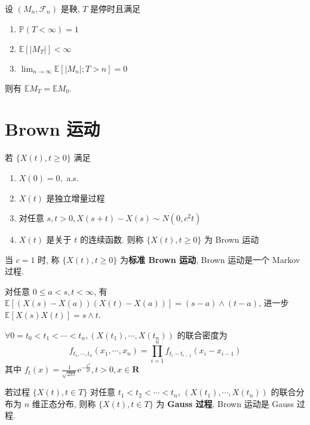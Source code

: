 \documentclass[10pt]{yerbaformat}
\begin{document}
\begin{theorem}[停止定理]
    设 $\left(M_{n}, \mathcal{F}_{n}\right)$ 是鞅, $T$ 是停时且满足
    \begin{enumerate}
        \item $\mathbb{P}(T<\infty)=1$
        \item $\mathbb{E}\left[\left|M_{T}\right|\right]<\infty$
        \item $\lim _{n \rightarrow \infty} \mathbb{E}\left[\left|M_{n}\right| ; T>n\right]=0$
    \end{enumerate}
    则有 $\mathbb{E} M_{T}=\mathbb{E} M_{0}$.
\end{theorem}

\section{Brown 运动}

\begin{definition}[Brown 运动]
    若 $\{X(t), t \geq 0\}$ 满足
    \begin{enumerate}
        \item $X(0)=0,$ a.s.
        \item $X(t)$ 是独立增量过程
        \item 对任意 $s, t>0, X(s+t)-X(s) \sim N\left(0, c^{2} t\right)$
        \item $X(t)$ 是关于 $t$ 的连续函数. 则称 $\{X(t), t \geq 0\}$ 为 Brown 运动
    \end{enumerate}
    当 $c=1$ 时, 称 $\{X(t), t \geq 0\}$ 为\textbf{标准 Brown 运动}, Brown 运动是一个 Markov 过程.
\end{definition}

\begin{theorem}
    对任意 $0 \leq a<s, t<\infty$, 有$\mathbb{E}[(X(s)-X(a))(X(t)-X(a))]=(s-a) \wedge(t-a)$, 进一步 $\mathbb{E}[X(s) X(t)]=s \wedge t$.
\end{theorem}

\begin{theorem}[有限维分布]
    $\forall 0=t_{0}<t_{1}<\cdots<t_{n},\left(X\left(t_{1}\right), \cdots, X\left(t_{n}\right)\right)$ 的联合密度为 $$f_{t_{1}, \cdots, t_{n}}\left(x_{1}, \cdots, x_{n}\right)=\prod_{i=1}^{n} f_{t_{i}-t_{i-1}}\left(x_{i}-x_{i-1}\right)$$ 其中 $f_{t}(x)=\frac{1}{\sqrt{2 \pi t}} \mathrm{e}^{-\frac{x^{2}}{2 t}}, t>0, x \in \mathbf{R}$
\end{theorem}

\begin{definition}[Gauss 过程]
    若过程 $\{X(t), t \in T\}$ 对任意 $t_{1}<t_{2}<\cdots<t_{n}$, $
        \left(X\left(t_{1}\right), \cdots, X\left(t_{n}\right)\right)$ 的联合分布为 $n$ 维正态分布, 则称 $\{X(t), t \in T\}$ 为 \textbf{Gauss 过程}. Brown 运动是 Gauss 过程.
\end{definition}
\end{document}
